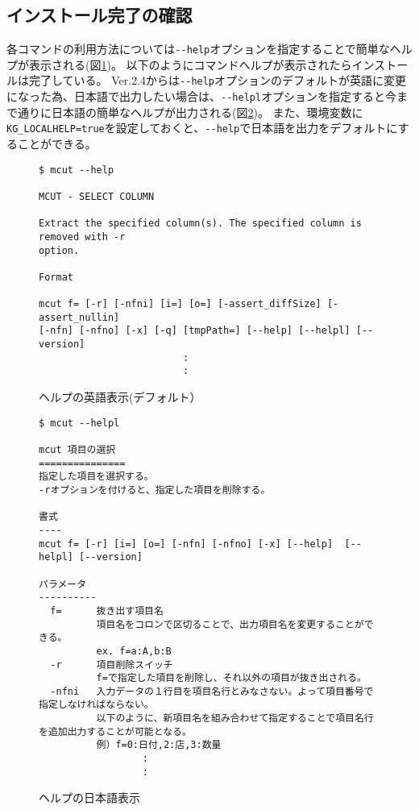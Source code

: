 \subsection{インストール完了の確認}
各コマンドの利用方法については\verb|--help|オプションを指定することで簡単なヘルプが表示される(図\ref{fig:abstract3_1})。
以下のようにコマンドヘルプが表示されたらインストールは完了している。
Ver.2.4からは\verb|--help|オプションのデフォルトが英語に変更になった為、日本語で出力したい場合は、\verb|--helpl|オプションを指定すると今まで通りに日本語の簡単なヘルプが出力される(図\ref{fig:abstract3_2})。
また、環境変数に\verb|KG_LOCALHELP=true|を設定しておくと、\verb|--help|で日本語を出力をデフォルトにすることができる。

\begin{figure}[htbp]
\begin{Verbatim}[baselinestretch=0.7,frame=single]
$ mcut --help

MCUT - SELECT COLUMN

Extract the specified column(s). The specified column is removed with -r
option.

Format

mcut f= [-r] [-nfni] [i=] [o=] [-assert_diffSize] [-assert_nullin]
[-nfn] [-nfno] [-x] [-q] [tmpPath=] [--help] [--helpl] [--version]
                         :
                         :

\end{Verbatim}
\caption{ヘルプの英語表示(デフォルト）\label{fig:abstract3_1}}
\end{figure}


\begin{figure}[htbp]
\begin{Verbatim}[baselinestretch=0.7,frame=single]
$ mcut --helpl

mcut 項目の選択
===============
指定した項目を選択する。
-rオプションを付けると、指定した項目を削除する。

書式
----
mcut f= [-r] [i=] [o=] [-nfn] [-nfno] [-x] [--help]  [--helpl] [--version]  

パラメータ
----------
  f=      抜き出す項目名
          項目名をコロンで区切ることで、出力項目名を変更することができる。
          ex. f=a:A,b:B
  -r      項目削除スイッチ
          f=で指定した項目を削除し、それ以外の項目が抜き出される。
  -nfni   入力データの１行目を項目名行とみなさない。よって項目番号で指定しなければならない。
          以下のように、新項目名を組み合わせて指定することで項目名行を追加出力することが可能となる。
          例）f=0:日付,2:店,3:数量
                  :
                  :

\end{Verbatim}
\caption{ヘルプの日本語表示\label{fig:abstract3_2}}
\end{figure}

